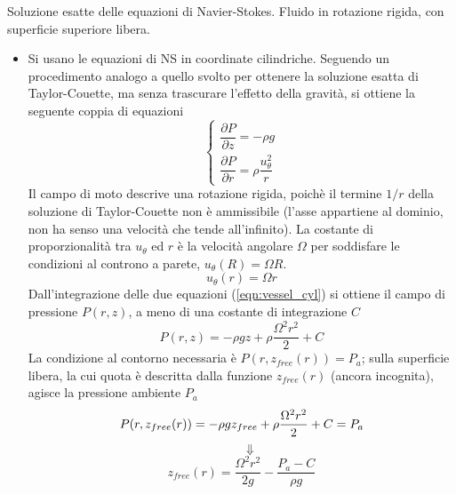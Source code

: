 \sol

\partone Soluzione esatte delle equazioni di Navier-Stokes.
 Fluido in rotazione rigida, con superficie superiore libera.

\parttwo
\begin{itemize}
\item
Si usano le equazioni di NS in coordinate cilindriche. Seguendo un procedimento
 analogo a quello svolto per ottenere la soluzione esatta di Taylor-Couette, ma senza
 trascurare l'effetto della gravità, si ottiene la seguente coppia di equazioni
\begin{equation}\label{eqn:vessel_cyl}
 \begin{cases}
  \dfrac{\partial P}{\partial z} = - \rho g \\
  \dfrac{\partial P}{\partial r} = \rho \dfrac{u_{\theta}^2}{r}
 \end{cases}
\end{equation}
Il campo di moto descrive una rotazione rigida, poichè il termine $1/r$ della soluzione
 di Taylor-Couette non è ammissibile (l'asse appartiene al dominio, non ha senso una
 velocità che tende all'infinito). La costante di proporzionalità tra $u_{\theta}$ ed $r$
 è la velocità angolare $\Omega$ per soddisfare le condizioni al controno a parete,
 $u_{\theta}(R) = \Omega R$.
\begin{equation}
  u_{\theta}(r) = \Omega r
\end{equation}
Dall'integrazione delle due equazioni (\ref{eqn:vessel_cyl}) si ottiene il campo di pressione
 $P(r,z)$, a meno di una costante di integrazione $C$
\begin{equation}\label{eqn:p}
 P(r,z) = -\rho g z + \rho \dfrac{\Omega^2 r^2}{2} + C
\end{equation}
La condizione al contorno necessaria è $P(r,z_{free}(r)) = P_a$; sulla superficie libera,
 la cui quota è descritta dalla funzione $z_{free}(r)$ (ancora incognita),
 agisce la pressione ambiente $P_a$
\begin{equation}
 P(r,z_{free}(r)) = -\rho g z_{free} + \rho \dfrac{\Omega^2 r^2}{2} + C = P_a \\
\end{equation}
\begin{equation*}
 \ \ \ \ \ \  \Downarrow
\end{equation*}
\begin{equation}\label{eqn:zfree}
 z_{free}(r) = \dfrac{\Omega^2 r^2}{2 g} - \dfrac{P_a - C}{\rho g}
\end{equation}


\end{itemize}
